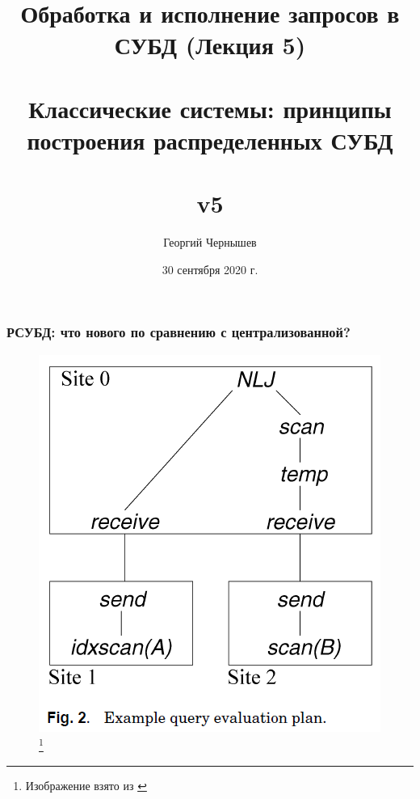 \documentclass{beamer}
\title[Обработка и исполнение запросов: лекция 5]{Обработка и исполнение запросов в СУБД (Лекция 5) \\~\\ Классические системы: принципы построения распределенных СУБД\\~\\ v5} %
\author{Георгий Чернышев} %
\institute[ВШЭ] %
{
Высшая Школа Экономики \\ %
\medskip
\textit{chernishev@gmail.com} %
}
\date{30 сентября 2020 г.}
\begin{document}
\begin{frame}
\titlepage %
\end{frame}

\begin{frame}
\frametitle{РСУБД: что нового по сравнению с централизованной?}

\begin{figure}[htb]
\includegraphics[width=\textwidth,height=0.80\textheight,keepaspectratio]{kossman-2.png} 
\footnote{\tiny{Изображение взято из \cite{Kossmann2000}}}
\end{figure}

\end{frame}
\end{document}
